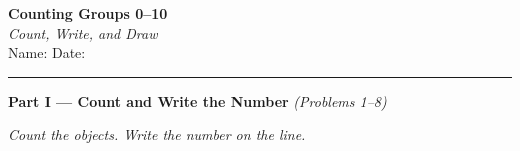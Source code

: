 \documentclass[12pt, letterpaper]{article}
\newcommand{\answerline}{\underline{\hspace{2.5cm}}}
\newcommand{\biganswerline}{\underline{\hspace{4cm}}}
\begin{document}
\begin{center}
  {\LARGE\textbf{\textcolor{scholared}{Counting Groups 0–10}}}\\[4pt]
  {\Large\textcolor{scholagold}{\textit{Count, Write, and Draw}}}\\[6pt]
  {\small Name: \biganswerline \hspace{1cm} Date: \answerline}
\end{center}

\vspace{4pt}
\noindent\textcolor{scholared}{\rule{\linewidth}{1pt}}
\vspace{4pt}


\noindent\textcolor{scholared}{\large\textbf{Part I — Count and Write the Number}} \hfill \textit{(Problems 1–8)}

\medskip
\noindent\textit{Count the objects. Write the number on the line.}

\bigskip
\end{document}
